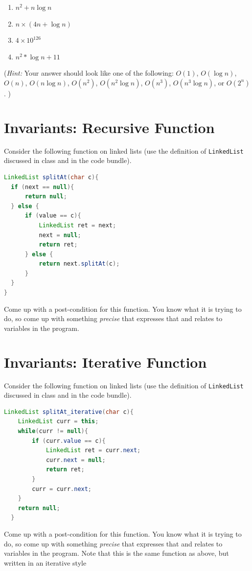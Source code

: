 \documentclass[twoside=false,DIV=14]{scrartcl}
\begin{document}
\begin{enumerate}
\item $n^2 + n\log n$
\item $n\times (4n + \log n)$

\item $4 \times 10^126$

\item $n^2 * \log n + 11$
\end{enumerate}

(\textit{Hint:} Your answer should look like one of the following:
$O(1)$, $O(\log n)$, $O(n)$, $O(n \log n)$, $O(n^2)$, $O(n^2 \log n)$, $O(n^3)$, $O(n^3 \log n)$, or $O(2^n)$.%
)

\section{Invariants: Recursive Function}
Consider the following function on linked lists (use the definition of \lstinline|LinkedList| discussed in class and in the code bundle).

\begin{lstlisting}[language=java]
LinkedList splitAt(char c){
  if (next == null){
      return null;
  } else {
      if (value == c){
          LinkedList ret = next;
          next = null;
          return ret;
      } else {
          return next.splitAt(c);
      }
  }
}
\end{lstlisting}
Come up with a post-condition for this function.  You know what it is trying to do, so come up with something \emph{precise} that expresses that and relates to variables in the program.

\section{Invariants: Iterative Function}
Consider the following function on linked lists (use the definition of \lstinline|LinkedList| discussed in class and in the code bundle).

\begin{lstlisting}[language=java]
  LinkedList splitAt_iterative(char c){
    LinkedList curr = this;
    while(curr != null){
        if (curr.value == c){
            LinkedList ret = curr.next;
            curr.next = null;
            return ret;
        }
        curr = curr.next;
    }
    return null;
  }
\end{lstlisting}
Come up with a post-condition for this function.  You know what it is trying to do, so come up with something \emph{precise} that expresses that and relates to variables in the program.  Note that this is the same function as above, but written in an iterative style
\end{document}
